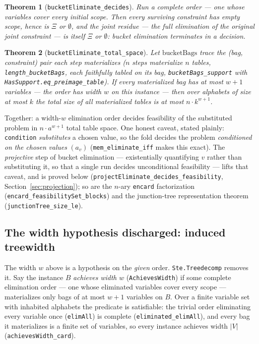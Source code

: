 \documentclass[11pt]{article}
\newtheorem{theorem}{Theorem}
\newcommand{\lean}[1]{\texttt{#1}}
\newcommand{\Xii}{\Xi}
\begin{document}
\begin{theorem}[\lean{bucketEliminate\_decides}]
Run a complete order --- one whose variables cover every initial
scope.  Then every surviving constraint has empty scope, hence is
$\Xii$ or $\emptyset$, and the joint residue --- the full elimination
of the original joint constraint --- is itself $\Xii$ or $\emptyset$:
bucket elimination terminates in a decision.
\end{theorem}

\begin{theorem}[\lean{bucketEliminate\_total\_space}]
Let $\mathrm{bucketBags}$ trace the (bag, constraint) pair each step
materializes ($n$ steps materialize $n$ tables,
\lean{length\_bucketBags}, each faithfully tabled on its bag,
\lean{bucketBags\_support} with
\lean{HasSupport.eq\_preimage\_table}).  If every materialized bag has
at most $w + 1$ variables --- the order has width $w$ on this instance
--- then over alphabets of size at most $k$ the total size of all
materialized tables is at most $n \cdot k^{w+1}$.
\end{theorem}

Together: a width-$w$ elimination order decides feasibility of the
substituted problem in $n \cdot a^{w+1}$ total table space.  One
honest caveat, stated plainly: \lean{condition} \emph{substitutes} a
chosen value, so the fold decides the problem \emph{conditioned on the
chosen values} $(a_v)$ (\lean{mem\_eliminate\_iff} makes this exact).
The \emph{projective} step of bucket elimination --- existentially
quantifying $v$ rather than substituting it, so that a single run
decides unconditional feasibility --- lifts that caveat, and is proved
below (\lean{projectEliminate\_decides\_feasibility},
Section~\ref{sec:projection}); so are the $n$-ary \lean{encard}
factorization (\lean{encard\_feasibilitySet\_blocks}) and the
junction-tree representation theorem
(\lean{junctionTree\_size\_le}).

\subsection*{The width hypothesis discharged: induced treewidth}

The width $w$ above is a hypothesis on the \emph{given} order.
\lean{Ste.Treedecomp} removes it.  Say the instance $B$ \emph{achieves
width $w$} (\lean{AchievesWidth}) if some complete elimination order
--- one whose eliminated variables cover every scope --- materializes
only bags of at most $w + 1$ variables on $B$.  Over a finite variable
set with inhabited alphabets the predicate is satisfiable: the trivial
order eliminating every variable once (\lean{elimAll}) is complete
(\lean{eliminated\_elimAll}), and every bag it materializes is a
finite set of variables, so every instance achieves width $|V|$
(\lean{achievesWidth\_card}).
\end{document}
